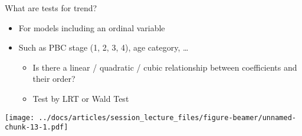 \documentclass[
  ignorenonframetext,
]{beamer}
\providecommand{\tightlist}{%
  \setlength{\itemsep}{0pt}\setlength{\parskip}{0pt}}
\begin{document}
\begin{frame}{What are tests for trend?}
\protect\hypertarget{what-are-tests-for-trend}{}

\begin{itemize}
\tightlist
\item
  For models including an ordinal variable
\item
  Such as PBC stage (1, 2, 3, 4), age category, \ldots{}

  \begin{itemize}
  \tightlist
  \item
    Is there a linear / quadratic / cubic relationship between
    coefficients and their order?
  \item
    Test by LRT or Wald Test
  \end{itemize}
\end{itemize}

\texttt{[image: ../docs/articles/session\_lecture\_files/figure-beamer/unnamed-chunk-13-1.pdf]}

\end{frame}
\end{document}
